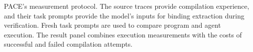 \caption{PACE's measurement protocol.
The source traces provide compilation experience, and their task prompts provide the model's inputs for binding extraction during verification.
Fresh task prompts are used to compare program and agent execution.
The result panel combines execution measurements with the costs of successful and failed compilation attempts.}
